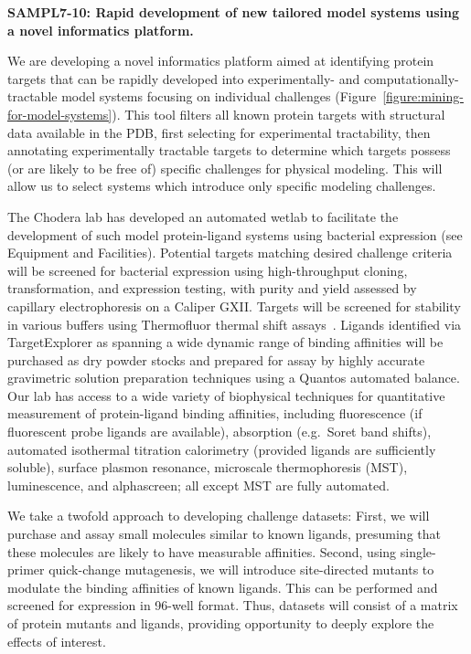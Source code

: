 \documentclass[11pt]{article}
\begin{document}
\textbf{SAMPL7-10: Rapid development of new tailored model systems using a novel informatics platform.}

We are developing a novel informatics platform aimed at identifying protein targets that can be rapidly developed into experimentally- and computationally-tractable model systems focusing on individual challenges (Figure~\ref{figure:mining-for-model-systems}).
This tool filters all known protein targets with structural data available in the PDB, first selecting for experimental tractability, then annotating experimentally tractable targets to determine which targets possess (or are likely to be free of) specific challenges for physical modeling.
This will allow us to select systems which introduce only specific modeling challenges.

The Chodera lab has developed an automated wetlab to facilitate the development of such model protein-ligand systems using bacterial expression (see Equipment and Facilities).
Potential targets matching desired challenge criteria will be screened for bacterial expression using high-throughput cloning, transformation, and expression testing, with purity and yield assessed by capillary electrophoresis on a Caliper GXII.
Targets will be screened for stability in various buffers using Thermofluor thermal shift assays~\cite{Reinhard:2013:ActaCrystallographicaSectionFStructuralBiologyandCrystallizationCommunications}.
Ligands identified via TargetExplorer as spanning a wide dynamic range of binding affinities will be purchased as dry powder stocks and prepared for assay by highly accurate gravimetric solution preparation techniques using a Quantos automated balance.
Our lab has access to a wide variety of biophysical techniques for quantitative measurement of protein-ligand binding affinities, including fluorescence (if fluorescent probe ligands are available), absorption (e.g.~Soret band shifts), automated isothermal titration calorimetry (provided ligands are sufficiently soluble), surface plasmon resonance, microscale thermophoresis (MST), luminescence, and alphascreen; all except MST are fully automated. 

We take a twofold approach to developing challenge datasets:
First, we will purchase and assay small molecules similar to known ligands, presuming that these molecules are likely to have measurable affinities.
Second, using single-primer quick-change mutagenesis, we will introduce site-directed mutants to modulate the binding affinities of known ligands.
This can be performed and screened for expression in 96-well format.
Thus, datasets will consist of a matrix of protein mutants and ligands, providing opportunity to deeply explore the effects of interest.
\end{document}
